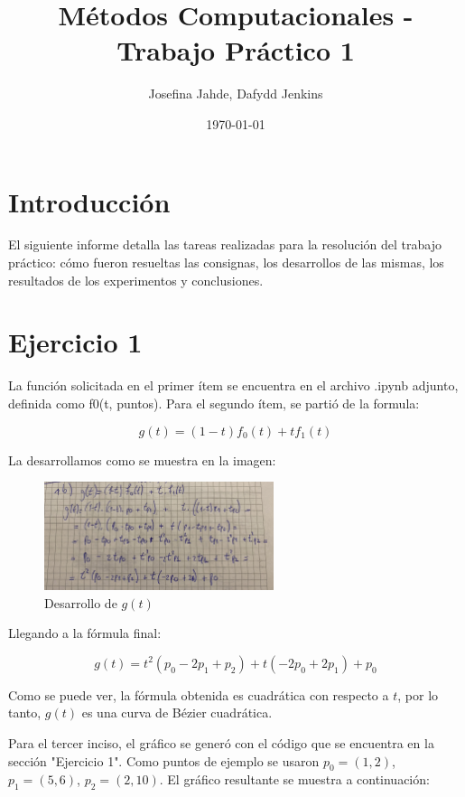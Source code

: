 \documentclass{article}
\title{Métodos Computacionales - Trabajo Práctico 1}
\author{Josefina Jahde, Dafydd Jenkins}
\date{\today}
\begin{document}
\maketitle

\section*{Introducción}
El siguiente informe detalla las tareas realizadas para la resolución del trabajo práctico: cómo fueron resueltas las consignas, los desarrollos de las mismas, los resultados de los experimentos y conclusiones.


\section*{Ejercicio 1}
La función solicitada en el primer ítem se encuentra en el archivo .ipynb adjunto, definida como f0(t, puntos).
Para el segundo ítem, se partió de la formula:

$$
g(t) = (1 - t)f_0(t) + t f_1(t)
$$

La desarrollamos como se muestra en la imagen:

\begin{figure}[H]
    \centering
    \includegraphics[width=0.6\textwidth]{imagenes/1b.jpg}
    \caption{Desarrollo de $g(t)$}
    \label{fig:ejemplo}
\end{figure}

Llegando a la fórmula final:

$$
g(t) = t^2 (p_0 - 2 p_1 + p_2) + t (-2 p_0 + 2 p_1) + p_0
$$

Como se puede ver, la fórmula obtenida es cuadrática con respecto a $t$, por lo tanto, $g(t)$ es una curva de Bézier cuadrática.

Para el tercer inciso, el gráfico se generó con el código que se encuentra en la sección "Ejercicio 1". Como puntos de ejemplo se usaron $p_0 = (1, 2)$, $p_1 = (5, 6)$, $p_2 = (2, 10)$. El gráfico resultante se muestra  a continuación:
\end{document}
